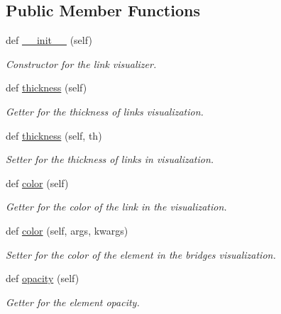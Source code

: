 \subsection*{Public Member Functions}
\begin{DoxyCompactItemize}
\item 
def \hyperlink{classbridges_1_1link__visualizer_1_1_link_visualizer_a9994004a7808bdcaa6f18ebfd9b7717a}{\+\_\+\+\_\+init\+\_\+\+\_\+} (self)
\begin{DoxyCompactList}\small\item\em Constructor for the link visualizer\textquotesingle{}. \end{DoxyCompactList}\item 
def \hyperlink{classbridges_1_1link__visualizer_1_1_link_visualizer_a4a89f95ecc6623ba17d2c47d7425c05b}{thickness} (self)
\begin{DoxyCompactList}\small\item\em Getter for the thickness of links visualization. \end{DoxyCompactList}\item 
def \hyperlink{classbridges_1_1link__visualizer_1_1_link_visualizer_af244bbe99885785f7dd3bb9460c1d21a}{thickness} (self, th)
\begin{DoxyCompactList}\small\item\em Setter for the thickness of links in visualization. \end{DoxyCompactList}\item 
def \hyperlink{classbridges_1_1link__visualizer_1_1_link_visualizer_ad87b36af48a35e41c9cad10239b4f7fb}{color} (self)
\begin{DoxyCompactList}\small\item\em Getter for the color of the link in the visualization. \end{DoxyCompactList}\item 
def \hyperlink{classbridges_1_1link__visualizer_1_1_link_visualizer_a3ae57af9d642648e0a581fd578084e08}{color} (self, args, kwargs)
\begin{DoxyCompactList}\small\item\em Setter for the color of the element in the bridges visualization. \end{DoxyCompactList}\item 
def \hyperlink{classbridges_1_1link__visualizer_1_1_link_visualizer_a777892e054f00e8ef0291c5d41ce7f75}{opacity} (self)
\begin{DoxyCompactList}\small\item\em Getter for the element opacity. \end{DoxyCompactList}\item 

\end{DoxyCompactItemize}
